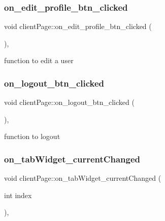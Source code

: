 \subsubsection{\texorpdfstring{on\+\_\+edit\+\_\+profile\+\_\+btn\+\_\+clicked}{on\_edit\_profile\_btn\_clicked}}
{\footnotesize\ttfamily void client\+Page\+::on\+\_\+edit\+\_\+profile\+\_\+btn\+\_\+clicked (\begin{DoxyParamCaption}{ }\end{DoxyParamCaption})\hspace{0.3cm}{\ttfamily [private]}, {\ttfamily [slot]}}



function to edit a user 

\mbox{\label{classclientPage_aaa4bc6d404c46a5d066fd566e902f5d9}} 
\subsubsection{\texorpdfstring{on\+\_\+logout\+\_\+btn\+\_\+clicked}{on\_logout\_btn\_clicked}}
{\footnotesize\ttfamily void client\+Page\+::on\+\_\+logout\+\_\+btn\+\_\+clicked (\begin{DoxyParamCaption}{ }\end{DoxyParamCaption})\hspace{0.3cm}{\ttfamily [private]}, {\ttfamily [slot]}}



function to logout 

\mbox{\label{classclientPage_a8485bac1ad742c7fe4bb4b14a504b506}} 
\subsubsection{\texorpdfstring{on\+\_\+tab\+Widget\+\_\+current\+Changed}{on\_tabWidget\_currentChanged}}
{\footnotesize\ttfamily void client\+Page\+::on\+\_\+tab\+Widget\+\_\+current\+Changed (\begin{DoxyParamCaption}\item[{int}]{index }\end{DoxyParamCaption})\hspace{0.3cm}{\ttfamily [private]}, {\ttfamily [slot]}}



